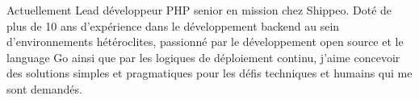 

\begin{cvparagraph}

Actuellement Lead développeur PHP senior en mission chez Shippeo. \newline Doté de plus de 10 ans 
d'expérience dans le développement backend au sein d'environnements hétéroclites, passionné par le 
développement open source et le language Go ainsi que par les logiques de déploiement continu, j'aime 
concevoir des solutions simples et pragmatiques pour les défis techniques et humains qui me sont demandés.
\end{cvparagraph}
